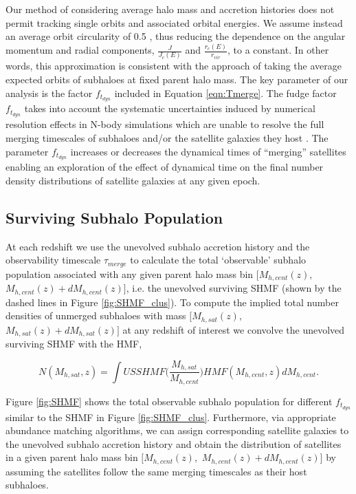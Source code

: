 Our method of considering average halo mass and accretion histories does not permit tracking single orbits and associated orbital energies. We assume instead an average orbit circularity of 0.5 \citep{Khochfar2006OrbitalHalos}, thus reducing the dependence on the angular momentum and radial components, $\frac{J}{J_c(E)}$ and $\frac{r_c(E)}{r_{vir}}$, to a constant. In other words, this approximation is consistent with the approach of taking the average expected orbits of subhaloes at fixed parent halo mass.
The key parameter of our analysis is the factor $f_{t_{dyn}}$ included in Equation \ref{eqn:Tmerge}.
The fudge factor $f_{t_{dyn}}$ takes into account the systematic uncertainties induced by numerical resolution effects in N-body simulations which are unable to resolve the full merging timescales of subhaloes and/or the satellite galaxies they host \citep{vandenBosch2018DisruptionFiction}. The parameter $f_{t_{dyn}}$ increases or decreases the dynamical times of  ``merging'' satellites enabling an exploration of the effect of dynamical time on the final number density distributions of satellite galaxies at any given epoch.

\subsection{Surviving Subhalo Population}
At each redshift we use the unevolved subhalo accretion history and the observability timescale $\tau_{merge}$ to calculate the total `observable' subhalo population associated with any given parent halo mass bin $[M_{h,cent}(z),$ $M_{h,cent}(z) + dM_{h,cent}(z)]$, i.e. the unevolved surviving SHMF (shown by the dashed lines in Figure \ref{fig:SHMF_clus}). To compute the implied total number densities of unmerged subhaloes with mass $[M_{h,sat}(z),$ $M_{h,sat}(z) + dM_{h,sat}(z)]$ at any redshift of interest we convolve the unevolved surviving SHMF with the HMF,

\begin{equation}
\label{eqn:GSHMF}
N(M_{h, sat}, z) =
\int USSHMF\Bigg(\frac{M_{h, sat}}{M_{h, cent}}\Bigg)HMF(M_{h, cent}, z)dM_{h, cent}.
\end{equation}

Figure \ref{fig:SHMF} shows the total observable subhalo population for different  $f_{t_{dyn}}$ similar to the SHMF in Figure \ref{fig:SHMF_clus}. Furthermore, via appropriate abundance matching algorithms, we can assign corresponding satellite galaxies to the unevolved subhalo accretion history and obtain the distribution of satellites in a given parent halo mass bin $[M_{h,cent}(z),$ $M_{h,cent}(z) + dM_{h,cent}(z)]$ by assuming the satellites follow the same merging timescales as their host subhaloes.

